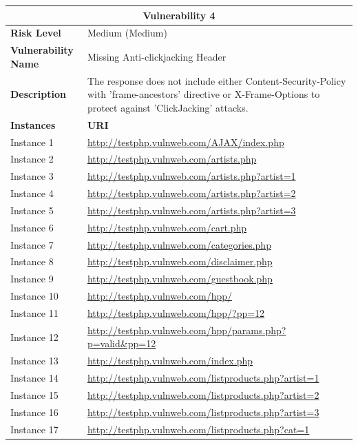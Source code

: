 \documentclass[12pt]{article}
\begin{document}
\begin{center}
\renewcommand{\arraystretch}{1.3}
\begin{longtable}{|l|p{10cm}|}
\hline
\multicolumn{2}{|c|}{\textbf{Vulnerability 4}} \\
\hline
\textbf{Risk Level} & Medium (Medium) \\
\hline
\textbf{Vulnerability Name} & Missing Anti-clickjacking Header \\
\hline
\textbf{Description} & The response does not include either Content-Security-Policy with 'frame-ancestors' directive or X-Frame-Options to protect against 'ClickJacking' attacks. \\
\hline
\textbf{Instances} & \textbf{URI} \\
\hline
Instance 1 & \url{http://testphp.vulnweb.com/AJAX/index.php} \\
\hline
Instance 2 & \url{http://testphp.vulnweb.com/artists.php} \\
\hline
Instance 3 & \url{http://testphp.vulnweb.com/artists.php?artist=1} \\
\hline
Instance 4 & \url{http://testphp.vulnweb.com/artists.php?artist=2} \\
\hline
Instance 5 & \url{http://testphp.vulnweb.com/artists.php?artist=3} \\
\hline
Instance 6 & \url{http://testphp.vulnweb.com/cart.php} \\
\hline
Instance 7 & \url{http://testphp.vulnweb.com/categories.php} \\
\hline
Instance 8 & \url{http://testphp.vulnweb.com/disclaimer.php} \\
\hline
Instance 9 & \url{http://testphp.vulnweb.com/guestbook.php} \\
\hline
Instance 10 & \url{http://testphp.vulnweb.com/hpp/} \\
\hline
Instance 11 & \url{http://testphp.vulnweb.com/hpp/?pp=12} \\
\hline
Instance 12 & \url{http://testphp.vulnweb.com/hpp/params.php?p=valid\&pp=12} \\
\hline
Instance 13 & \url{http://testphp.vulnweb.com/index.php} \\
\hline
Instance 14 & \url{http://testphp.vulnweb.com/listproducts.php?artist=1} \\
\hline
Instance 15 & \url{http://testphp.vulnweb.com/listproducts.php?artist=2} \\
\hline
Instance 16 & \url{http://testphp.vulnweb.com/listproducts.php?artist=3} \\
\hline
Instance 17 & \url{http://testphp.vulnweb.com/listproducts.php?cat=1} \\

\end{longtable}
\end{center}
\end{document}
